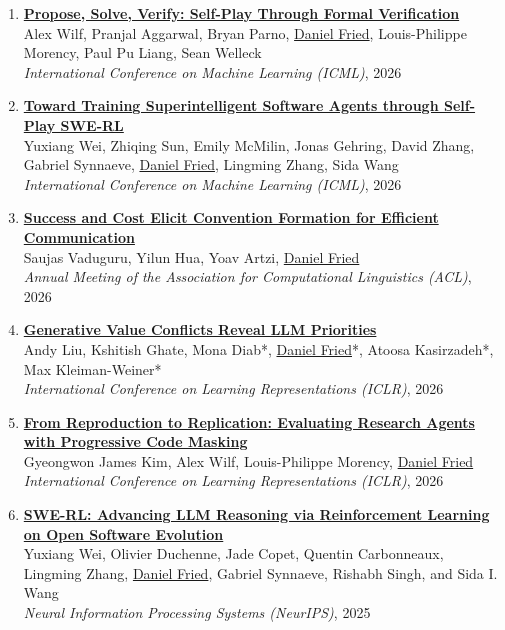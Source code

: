 \begin{enumerate}[leftmargin=-1mm,partopsep=0pt]
\item \href{https://arxiv.org/abs/2512.18160}{\textbf{Propose, Solve, Verify: Self-Play Through Formal Verification}} \\
  Alex Wilf, Pranjal Aggarwal, Bryan Parno, \underline{Daniel Fried}, Louis-Philippe Morency, Paul Pu Liang, Sean Welleck\\
  \emph{International Conference on Machine Learning (ICML)}, 2026

\item \href{https://arxiv.org/abs/2512.18552}{\textbf{Toward Training Superintelligent Software Agents through Self-Play SWE-RL}} \\
  Yuxiang Wei, Zhiqing Sun, Emily McMilin, Jonas Gehring, David Zhang, Gabriel Synnaeve, \underline{Daniel Fried}, Lingming Zhang, Sida Wang\\
  \emph{International Conference on Machine Learning (ICML)}, 2026

\item \href{https://arxiv.org/abs/2510.24023}{\textbf{Success and Cost Elicit Convention Formation for Efficient Communication}} \\
  Saujas Vaduguru, Yilun Hua, Yoav Artzi, \underline{Daniel Fried}\\
  \emph{Annual Meeting of the Association for Computational Linguistics (ACL)}, 2026

\item \href{https://arxiv.org/abs/2509.25369}{\textbf{Generative Value Conflicts Reveal LLM Priorities}} \\
  Andy Liu, Kshitish Ghate, Mona Diab*, \underline{Daniel Fried}*, Atoosa Kasirzadeh*, Max Kleiman-Weiner*\\
  \emph{International Conference on Learning Representations (ICLR)}, 2026

\item \href{https://arxiv.org/abs/2506.19724}{\textbf{From Reproduction to Replication: Evaluating Research Agents with Progressive Code Masking}} \\
  Gyeongwon James Kim, Alex Wilf, Louis-Philippe Morency, \underline{Daniel Fried}\\
  \emph{International Conference on Learning Representations (ICLR)}, 2026

\item \href{https://arxiv.org/abs/2502.18449}{\textbf{SWE-RL: Advancing LLM Reasoning via Reinforcement Learning on Open Software Evolution}} \\
  Yuxiang Wei, Olivier Duchenne, Jade Copet, Quentin Carbonneaux, Lingming Zhang, \underline{Daniel Fried}, Gabriel Synnaeve, Rishabh Singh, and Sida I. Wang\\
  \emph{Neural Information Processing Systems (NeurIPS)}, 2025


\end{enumerate}
